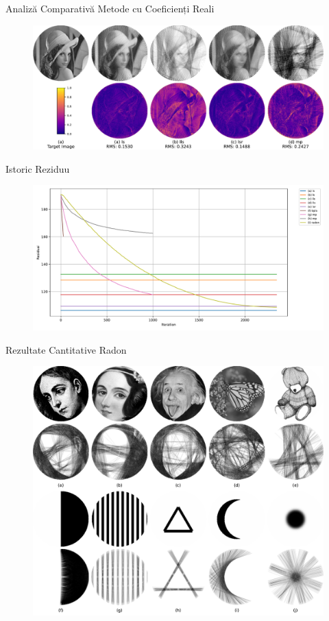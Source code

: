 \documentclass[aspectratio=169,xcolor=dvipsnames]{beamer}
\begin{document}
\begin{frame}{Analiză Comparativă Metode cu Coeficienți Reali}
    \begin{figure}
        \includegraphics[width=0.9\linewidth]{images/diff_images.pdf}
    \end{figure}
\end{frame}

\begin{frame}{Istoric Reziduu}
    \begin{figure}
        \includegraphics[width=0.9\linewidth]{images/residual_history.pdf}
    \end{figure}
\end{frame}

\begin{frame}{Rezultate Cantitative Radon}
    \begin{figure}
        \includegraphics[width=0.6\linewidth]{images/radon_quantitative_test.pdf}
    \end{figure}
\end{frame}
\end{document}

